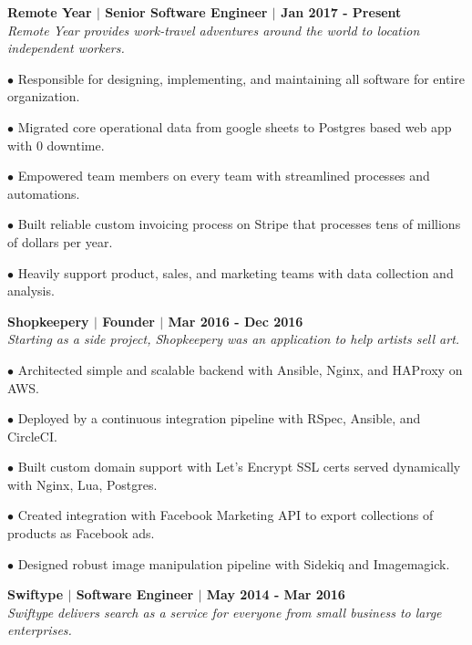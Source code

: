 \documentclass{article}
\begin{document}
	\begin{description}
	
	\item \textbf{Remote Year $|$ Senior Software Engineer $|$ Jan 2017 - Present} \\
	 \textit{Remote Year provides work-travel adventures around the world to location independent workers.}
	 \item$\bullet$ Responsible for designing, implementing, and maintaining all software for entire organization.
	 \item$\bullet$ Migrated core operational data from google sheets to Postgres based web app with 0 downtime.
	 \item$\bullet$ Empowered team members on every team with streamlined processes and automations.
	 \item$\bullet$ Built reliable custom invoicing process on Stripe that processes tens of millions of dollars per year.
	 \item$\bullet$ Heavily support product, sales, and marketing teams with data collection and analysis.
	
	 \item \textbf{Shopkeepery $|$ Founder $|$ Mar 2016 - Dec 2016} \\
	 \textit{Starting as a side project, Shopkeepery was an application to help artists sell art.}
	 
	 \item$\bullet$ Architected simple and scalable backend with Ansible, Nginx, and HAProxy on AWS.
	 
	 \item$\bullet$ Deployed by a continuous integration pipeline with RSpec, Ansible, and CircleCI.
	 \item$\bullet$ Built custom domain support with Let’s Encrypt SSL certs served dynamically with Nginx, Lua, Postgres.
	 \item$\bullet$ Created integration with Facebook Marketing API to export collections of products as Facebook ads.
	 \item$\bullet$ Designed robust image manipulation pipeline with Sidekiq and Imagemagick.
	
	 \item \textbf{Swiftype $|$ Software Engineer $|$ May 2014 - Mar 2016} \\
	 \textit{Swiftype delivers search as a service for everyone from small business to large enterprises.}
	 

\end{description}
\end{document}
